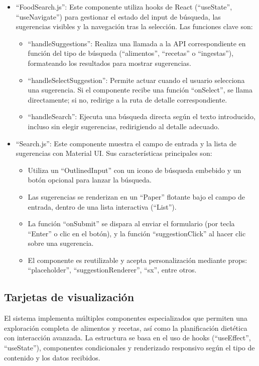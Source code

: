 \begin{itemize}
    \item ``FoodSearch.js'':
    Este componente utiliza hooks de React (``useState'', ``useNavigate'') para gestionar el estado del input de búsqueda, las sugerencias visibles y la navegación tras la selección. Las funciones clave son:
    \begin{itemize}
        \item ``handleSuggestions'': Realiza una llamada a la API correspondiente en función del tipo de búsqueda (``alimentos'', ``recetas'' o ``ingestas''), formateando los resultados para mostrar sugerencias.
        \item ``handleSelectSuggestion'': Permite actuar cuando el usuario selecciona una sugerencia. Si el componente recibe una función ``onSelect'', se llama directamente; si no, redirige a la ruta de detalle correspondiente.
        \item ``handleSearch'': Ejecuta una búsqueda directa según el texto introducido, incluso sin elegir sugerencias, redirigiendo al detalle adecuado.
    \end{itemize}

    \item ``Search.js'':
    Este componente muestra el campo de entrada y la lista de sugerencias con Material UI. Sus características principales son:
    \begin{itemize}
        \item Utiliza un ``OutlinedInput'' con un icono de búsqueda embebido y un botón opcional para lanzar la búsqueda.
        \item Las sugerencias se renderizan en un ``Paper'' flotante bajo el campo de entrada, dentro de una lista interactiva (``List'').
        \item La función ``onSubmit'' se dispara al enviar el formulario (por tecla ``Enter'' o clic en el botón), y la función ``suggestionClick'' al hacer clic sobre una sugerencia.
        \item El componente es reutilizable y acepta personalización mediante props: ``placeholder'', ``suggestionRenderer'', ``sx'', entre otros.
    \end{itemize}
\end{itemize}

\subsection*{Tarjetas de visualización}
El sistema implementa múltiples componentes especializados que permiten una exploración completa de alimentos y recetas, así como la planificación dietética con interacción avanzada. La estructura se basa en el uso de hooks (``useEffect'', ``useState''), componentes condicionales y renderizado responsivo según el tipo de contenido y los datos recibidos.

